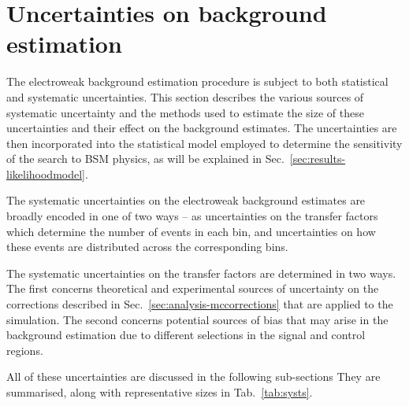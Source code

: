 

\section{Uncertainties on background estimation}
\label{sec:analysis-systematics}
The electroweak background estimation procedure is subject to both statistical 
and 
systematic uncertainties. This section describes the various sources of 
systematic uncertainty and the methods used to estimate the size of these 
uncertainties and their effect on the background estimates. The uncertainties 
are then incorporated into the statistical model employed to determine the 
sensitivity of the search to BSM physics, as will be explained in 
Sec.~\ref{sec:results-likelihoodmodel}.

The systematic uncertainties on the electroweak background estimates are 
broadly encoded in one of two ways -- as uncertainties on the transfer factors 
which determine the number of events in each \njnbht bin, and uncertainties on 
how these events are distributed across the corresponding \mht bins. 

The systematic uncertainties on the transfer factors are determined in two 
ways. The first concerns theoretical and experimental sources of uncertainty on 
the corrections described in Sec.~\ref{sec:analysis-mccorrections} that are 
applied to the simulation. The second concerns potential sources of 
bias that may arise in the background estimation due to different selections in 
the signal and control regions. 

All of these uncertainties are discussed in the following sub-sections
They are summarised, along with representative sizes in Tab.~\ref{tab:systs}.

